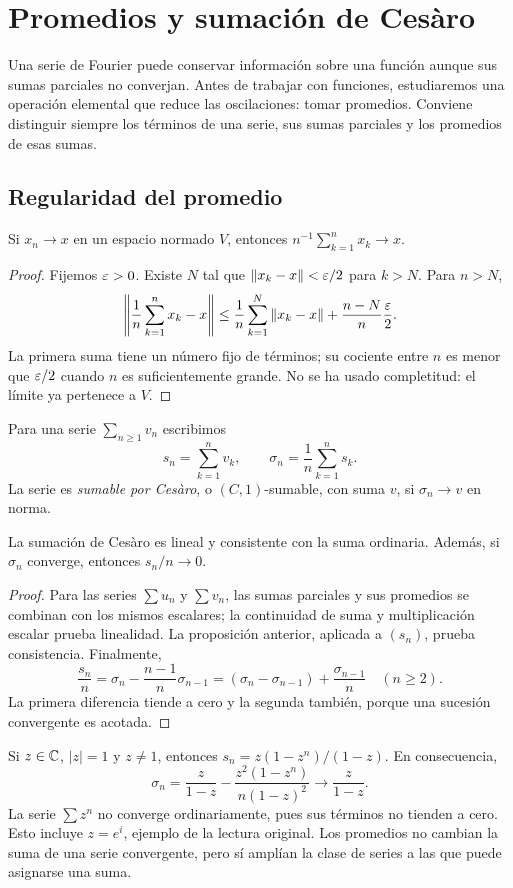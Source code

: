 \chapter{Promedios y sumación de Cesàro}\label{cap:v4-01}
Una serie de Fourier puede conservar información sobre una función aunque sus sumas parciales no converjan. Antes de trabajar con funciones, estudiaremos una operación elemental que reduce las oscilaciones: tomar promedios. Conviene distinguir siempre los términos de una serie, sus sumas parciales y los promedios de esas sumas.

\section{Regularidad del promedio}\label{lectura:v4-01}
\begin{proposicion}
Si $x_n\to x$ en un espacio normado $V$, entonces $n^{-1}\sum_{k=1}^nx_k\to x$.
\end{proposicion}
\begin{proof}
Fijemos $\varepsilon>0$. Existe $N$ tal que $\left\lVert x_k-x\right\rVert<\varepsilon/2$ para $k>N$. Para $n>N$,
\[
 \left\|\frac1n\sum_{k=1}^nx_k-x\right\|
 \leq\frac1n\sum_{k=1}^N\left\lVert x_k-x\right\rVert+\frac{n-N}{n}\frac{\varepsilon}2.
\]
La primera suma tiene un número fijo de términos; su cociente entre $n$ es menor que $\varepsilon/2$ cuando $n$ es suficientemente grande. No se ha usado completitud: el límite ya pertenece a $V$.
\end{proof}
\begin{definicion}
Para una serie $\sum_{n\geq1}v_n$ escribimos
\[
 s_n=\sum_{k=1}^nv_k,\qquad \sigma_n=\frac1n\sum_{k=1}^ns_k.
\]
La serie es \emph{sumable por Cesàro}, o $(C,1)$-sumable, con suma $v$, si $\sigma_n\to v$ en norma.
\end{definicion}
\begin{proposicion}
La sumación de Cesàro es lineal y consistente con la suma ordinaria. Además, si $\sigma_n$ converge, entonces $s_n/n\to0$.
\end{proposicion}
\begin{proof}
Para las series $\sum u_n$ y $\sum v_n$, las sumas parciales y sus promedios se combinan con los mismos escalares; la continuidad de suma y multiplicación escalar prueba linealidad. La proposición anterior, aplicada a $(s_n)$, prueba consistencia. Finalmente,
\[
 \frac{s_n}{n}=\sigma_n-\frac{n-1}{n}\sigma_{n-1}
 =(\sigma_n-\sigma_{n-1})+\frac{\sigma_{n-1}}n\quad(n\geq2).
\]
La primera diferencia tiende a cero y la segunda también, porque una sucesión convergente es acotada.
\end{proof}
\begin{ejemplo}
Si $z\in\mathbb C$, $|z|=1$ y $z\ne1$, entonces $s_n=z(1-z^n)/(1-z)$. En consecuencia,
\[
 \sigma_n=\frac z{1-z}-\frac{z^2(1-z^n)}{n(1-z)^2}\longrightarrow\frac z{1-z}.
\]
La serie $\sum z^n$ no converge ordinariamente, pues sus términos no tienden a cero. Esto incluye $z=e^{i}$, ejemplo de la lectura original. Los promedios no cambian la suma de una serie convergente, pero sí amplían la clase de series a las que puede asignarse una suma.
\end{ejemplo}

